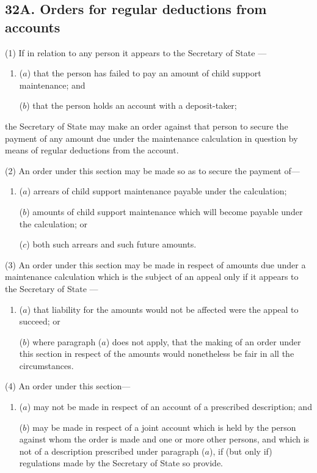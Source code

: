 \documentclass[12pt,a4paper]{article}
\begin{document}
\subsection{32A. Orders for regular deductions from accounts}

(1) If in relation to any person it appears to the 
Secretary of State%
---
\begin{enumerate}\item[]
($a$) that the person has failed to pay an amount of child support maintenance;
and

($b$) that the person holds an account with a deposit-taker;
\end{enumerate}
the Secretary of State  %
may make an order against that person to secure the payment of any amount due under the maintenance calculation in question by means of regular deductions from the account.

(2) An order under this section may be made so as to secure the payment of---
\begin{enumerate}\item[]
($a$) arrears of child support maintenance payable under the calculation;

($b$) amounts of child support maintenance which will become payable under the
calculation; or

($c$) both such arrears and such future amounts.
\end{enumerate}

\begin{sloppypar}
(3) An order under this section may be made in respect of amounts due under a maintenance calculation which is the subject of an appeal only if it appears to the 
Secretary of State%
---
\end{sloppypar}
\begin{enumerate}\item[]
($a$) that liability for the amounts would not be affected were the appeal to succeed;
or

($b$) where paragraph ($a$) does not apply, that the making of an order under this
section in respect of the amounts would nonetheless be fair in all the
circumstances.
\end{enumerate}

(4) An order under this section---
\begin{enumerate}\item[]
($a$) may not be made in respect of an account of a prescribed description; and

($b$) may be made in respect of a joint account which is held by the person against whom the order is made and one or more other persons, and which is not of a description prescribed under paragraph ($a$), if (but only if) regulations made by the Secretary of State so provide.
\end{enumerate}
\end{document}
